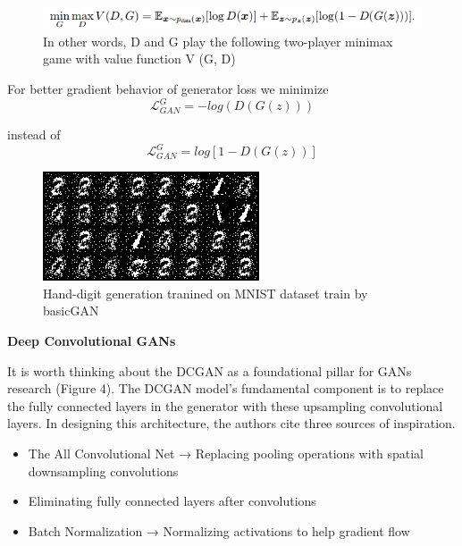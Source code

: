\documentclass{article}
\begin{document}
\begin{figure}[h]
    \centering
    \includegraphics[width=.7\textwidth]{images/gan_equation.png}
    \caption{In other words, D and G play the following two-player minimax game with
value function V (G, D)}
    \label{fig:mesh1}
\end{figure}

For better gradient behavior of generator loss we minimize
\begin{equation}
 \mathcal{L}_{GAN}^{G} =  - log(D(G(z)))
\end{equation}

instead of
\begin{equation}
 \mathcal{L}_{GAN}^{G} =  log[1 - D(G(z))]
\end{equation}

\begin{figure}[h]
    \centering
    \includegraphics[width=.6\textwidth]{images/basicgan_result.png}
    \caption{Hand-digit generation tranined on MNIST dataset train by basicGAN}
    \label{fig:mesh1}
\end{figure}



\medskip
\begin{center}
    {\Large{\textbf{Deep Convolutional GANs}}}
\end{center}
It is worth thinking about the DCGAN as a foundational pillar for GANs research (Figure 4). The DCGAN model’s fundamental component is to replace the fully connected layers in the generator with these upsampling convolutional layers. In designing this architecture, the authors cite three sources of inspiration.

\begin{itemize}

    \item The All Convolutional Net → Replacing pooling operations with spatial downsampling convolutions
    \item Eliminating fully connected layers after convolutions
    \item Batch Normalization → Normalizing activations to help gradient flow

\end{itemize}
\end{document}
